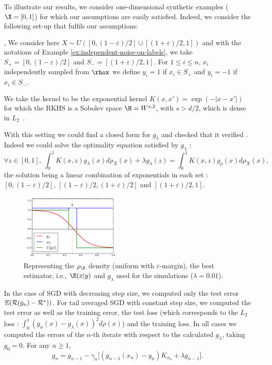 

To illustrate our results, we consider one-dimensional synthetic examples ($\X = [0,1] $) for which our assumptions are easily satisfied. 
Indeed, we consider the following set-up that fulfils our assumptions: 
\BIT
\item {},  We consider here $X \sim U\left([0,(1-\varepsilon)/2] \cup [(1+\varepsilon)/2,1]  \right)$ and with the notations of Example \ref{ex:independent-noise-on-labels}, we take $S_+ = [0,(1-\varepsilon)/2]$ and $S_- = [(1+\varepsilon)/2,1]$. For $1 \leq i \leq n$,  $x_i$ independently sampled from $\rhox$ we define $y_i = 1 $ if $x_i \in S_+$ and $y_i = -1 $ if $x_i \in S_-$.

\item {} We take the kernel to be the exponential  kernel $K(x,x') = \exp(-|x-x'|)$ for which the RKHS is a Sobolev space $\H = W^{s,2}$, with $s > d/2$, which is dense in $L_2$~\citet{adams2003sobolev}.

\item {} With this setting we could find a closed form for $g_\lambda$ and checked that it verified . Indeed we could solve the optimality equation satisfied by $g_\lambda$ : $$ \forall z \in [0,1], \ \int_{0}^1 K(x,z)g_\lambda(x) d\rho_X(x) + \lambda g_\lambda(z) = \int_{0}^1 K(x,z)g_\rho(x) d\rho_X(x),  $$ the solution being a linear combination of exponentials in each set : $[0,(1-\varepsilon)/2]$, $[(1-\varepsilon)/2,(1+\varepsilon)/2]$ and $[(1+\varepsilon)/2,1]$.
\EIT

\begin{figure}[ht]
    \centering
    \includegraphics[width=0.45\textwidth]{figures/zbis_densities.pdf}
    \caption{Representing the $\rho_\X$ density (uniform with $\varepsilon$-margin), the best estimator, i.e., $\E (x|y)$ and $g_\lambda$ used for the simulations ($\lambda = 0.01$).}
    \label{fig:densities}
\end{figure}

%
In the case of SGD with decreasing step size, we computed only the test error $\mathbb{E}({\cal R}(g_n)-{\cal R}^*))$. For tail averaged SGD with constant step size, we computed the test error as well as the training error, the test loss (which corresponds to the $L_2$ loss : $\int_0^1 (g_n (x) - g_\lambda(x))^2d\rho(x)$) and the training loss.
%
In all cases we computed the errors of the $n$-th iterate with respect to the calculated $g_\lambda$, taking $g_0 = 0$. For any $n \geqslant 1$,
$$g_n  =  {g}_{n-1} - \gamma_n  \big[ ( {g}_{n-1}(x_n)- y_n)K_{x_n}   + \lambda{g}_{n-1}  \big]. $$

